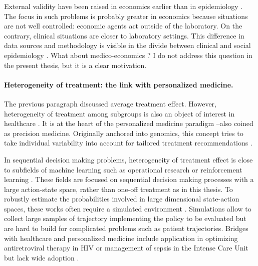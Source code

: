 \documentclass[french,12pt,twoside,a4paper]{book}
\begin{document}
\begin{background_box_left}
  External validity have been raised in economics earlier than in epidemiology
  \citep{deaton2020randomization}. The focus in such problems is probably
  greater in economics because situations are not well controlled:
  economic agents act outside of the laboratory. On the contrary, clinical
  situations are closer to laboratory settings. This difference in data sources and
  methodology is visible in the divide between clinical and social epidemiology
  \citep{zielhuis2001social}. What about medico-economics ? I do not address this question in the
  present thesis, but it is a clear motivation.

  \paragraph{Heterogeneity of treatment: the link with personalized medicine.}

  The previous paragraph discussed average treatment effect. However,
  heterogeneity of treatment among subgroups is also an object of interest in
  healthcare \citep{hernan2020causal}. It is at the heart of the personalized
  medicine paradigm --also coined as precision medicine. Originally anchored into
  genomics, this concept tries to take individual variability into account for
  tailored treatment recommendations \citep{schork2015personalized,
    topol2019high}.

  In sequential decision making problems, heterogeneity of
  treatment effect is close to subfields of machine learning such
  as operational research \citep{schaefer2004modeling} or reinforcement learning
  \citep{bareinboim2015bandits}. These fields are focused on sequential
  decision making processes with a large action-state space, rather than one-off
  treatment as in this thesis. To robustly estimate the probabilities involved
  in large dimensional state-action spaces, these works often require a
  simulated environment \citep{bennett2013artificial}. Simulations allow to
  collect large samples of trajectory implementing the policy to be evaluated
  but are hard to build for complicated problems such as patient trajectories.
  Bridges with healthcare and personalized medicine include application in
  optimizing antiretroviral therapy in HIV \citep{guez2008adaptive} or
  management of sepsis in the Intense Care Unit \citep{komorowski2018artificial}
  but lack wide adoption \citep{senn2018statistical}.

\end{background_box_left}
\end{document}
